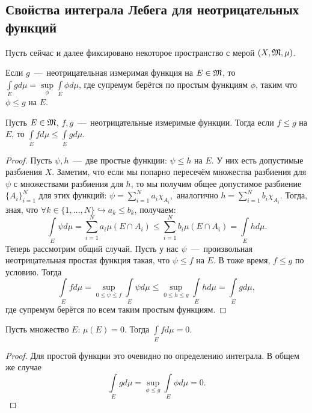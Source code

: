 \subsection{Свойства интеграла Лебега для неотрицательных функций}
\begin{reminder}
    Пусть сейчас и далее фиксировано некоторое пространство с мерой $(X, \mathfrak{M}, \mu)$.
\end{reminder}
\begin{reminder}
    Если $g$~---~неотрицательная измеримая функция на $E \in \mathfrak{M}$, то $\int\limits_E gd\mu = \sup\limits_{\phi} \int\limits_E \phi d\mu$, где супремум берётся по простым функциям $\phi$, таким что $\phi \leq g$ на $E$.
\end{reminder}

\begin{proposition}
    Пусть $E \in \mathfrak{M}$, $f, g$~---~неотрицательные измеримые функции. Тогда если $f \leq g$ на $E$, то $\int\limits_E fd\mu \leq \int\limits_E gd\mu$.
\end{proposition}
\begin{proof}
    Пусть $\psi, h$~---~две простые функции: $\psi \leq h$ на $E$. У них есть допустимые разбиения $X$. Заметим, что если мы попарно пересечём множества разбиения для $\psi$ с множествами разбиения для $h$, то мы получим общее допустимое разбиение $\{A_i\}_{i = 1}^N$ для этих функций: $\psi = \sum\limits_{i = 1}^N a_i\chi_{A_i},\text{ аналогично } h = \sum\limits_{i = 1}^N b_i\chi_{A_i}$. Тогда, зная, что $\forall k \in \{1,\dots, N\} \hookrightarrow a_k \leq b_k$, получаем:\[\int\limits_{E} \psi d\mu = \sum\limits_{i = 1}^N a_i \mu(E \cap A_i) \leq \sum\limits_{i = 1}^N b_i \mu(E \cap A_i) = \int\limits_E h d \mu.\] Теперь рассмотрим общий случай. Пусть у нас $\psi$~---~произвольная неотрицательная простая функция такая, что $\psi \leq f$ на $E$. В тоже время, $f \leq g$ по условию. Тогда \[\int\limits_E fd\mu = \sup\limits_{0 \leq \psi \leq f}\int\limits_E \psi d\mu \leq \sup\limits_{0 \leq h \leq g} \int\limits_{E} h d\mu = \int\limits_{E}g d\mu,\] где супремум берётся по всем таким простым функциям.
\end{proof}
\begin{proposition}
    Пусть множество $E$: $\mu(E) = 0$. Тогда $\int\limits_E fd\mu = 0$.
\end{proposition}
\begin{proof}
    Для простой функции это очевидно по определению интеграла. В общем же случае \[\int\limits_E gd\mu = \sup\limits_{\phi \leq g} \int\limits_E \phi d \mu = 0.\]
\end{proof}

